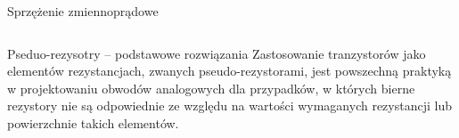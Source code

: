 \begin{frame}{Sprzężenie zmiennoprądowe}
\begin{columns}
\begin{block}{Pseduo-rezysotry -- podstawowe rozwiązania}
            {\renewcommand\normalsize{\small}%
            \normalsize
            Zastosowanie tranzystorów jako elementów rezystancjach, zwanych pseudo-rezystorami, jest powszechną praktyką w projektowaniu obwodów analogowych dla przypadków, w których bierne rezystory nie są odpowiednie ze względu na wartości wymaganych rezystancji lub powierzchnie takich elementów.    }
        \end{block}









    \end{columns}

\end{frame}

